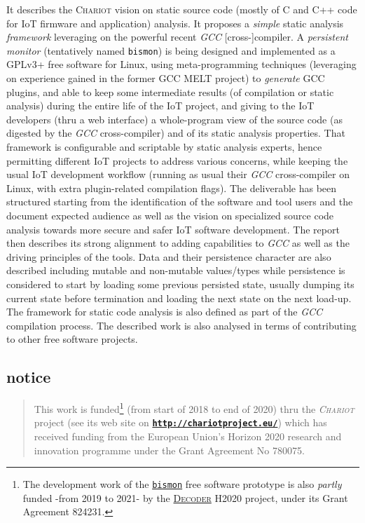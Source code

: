 \documentclass[11pt,a4paper,svgnames]{article}
\newcommand{\bmurl}[1]{{\href{#1}{\texttt{\textbf{#1}}}}}
\begin{document}
\begin{titlepage}
It describes the \textsc{Chariot} vision on static source code (mostly
of C and C++ code for IoT firmware and application) analysis. It
proposes a \emph{simple} static analysis \emph{framework} leveraging
on the powerful recent \emph{GCC} [cross-]compiler. A \emph{persistent
  monitor} (tentatively named \texttt{bismon}) is being designed and
implemented as a GPLv3+ free software for Linux, using
meta-programming techniques (leveraging on experience gained in the
former GCC MELT project) to \emph{generate} GCC plugins, and able to
keep some intermediate results (of compilation or static analysis)
during the entire life of the IoT project, and giving to the IoT
developers (thru a web interface) a whole-program view of the source
code (as digested by the \emph{GCC} cross-compiler) and of its static
analysis properties. That framework is configurable and scriptable by
static analysis experts, hence permitting different IoT projects to
address various concerns, while keeping the usual IoT development
workflow (running as usual their \emph{GCC} cross-compiler on Linux,
with extra plugin-related compilation flags).  The deliverable has
been structured starting from the identification of the software and
tool users and the document expected audience as well as the vision on
specialized source code analysis towards more secure and safer IoT
software development. The report then describes its strong alignment
to adding capabilities to \emph{GCC} as well as the driving principles of the
tools. Data and their persistence character are also described
including mutable and non-mutable values/types while persistence is
considered to start by loading some previous persisted state, usually
dumping its current state before termination and loading the next
state on the next load-up. The framework for static code analysis is
also defined as part of the \emph{GCC} compilation process. The described
work is also analysed in terms of contributing to other free software
projects.

\medskip

\bigskip

\subsection*{notice}

\begin{quote}
\begin{relsize}{-0.5}
This work  is funded\footnote{The development work of the
  \href{http://github.com/bstarynk/bismon}{\texttt{bismon}} free
  software prototype is also \emph{partly} funded -from 2019 to 2021-
  by the \href{http://decoder-project.eu/}{\textsc{Decoder}} H2020
  project, under its Grant Agreement 824231.} (from start of 2018 to
end of 2020) thru the \emph{\textsc{Chariot}} project (see its web
site on \bmurl{http://chariotproject.eu/}) which has received funding
from the European Union’s Horizon 2020 research and innovation
programme under the Grant Agreement No 780075.
\end{relsize}
\end{quote}
\medskip




\end{titlepage}
\end{document}

